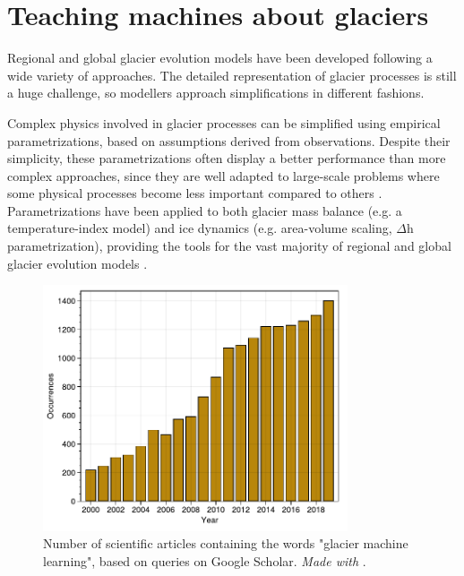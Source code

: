 \section{Teaching machines about glaciers}
\label{intro:ml}

Regional and global glacier evolution models have been developed following a wide variety of approaches. The detailed representation of glacier processes is still a huge challenge, so modellers approach simplifications in different fashions. 

Complex physics involved in glacier processes can be simplified using empirical parametrizations, based on assumptions derived from observations. Despite their simplicity, these parametrizations often display a better performance than more complex approaches, since they are well adapted to large-scale problems where some physical processes become less important compared to others \citep{reveillet_relative_2018}. Parametrizations have been applied to both glacier mass balance (e.g. a temperature-index model) and ice dynamics (e.g. area-volume scaling, $\Delta$h parametrization), providing the tools for the vast majority of regional and global glacier evolution models \citep[e.g.][]{marzeion_past_2012, huss_new_2015, maussion_open_2019}.

\begin{figure}[h]
\centering
\includegraphics[width=9cm]{Figures/intro/Figure_3.pdf}
\caption{Number of scientific articles containing the words "glacier machine learning", based on queries on Google Scholar. \textit{Made with} \citet{strobel_pold87academic-keyword-occurrence_2018}.}
\label{intro:fig3}
\end{figure} 

